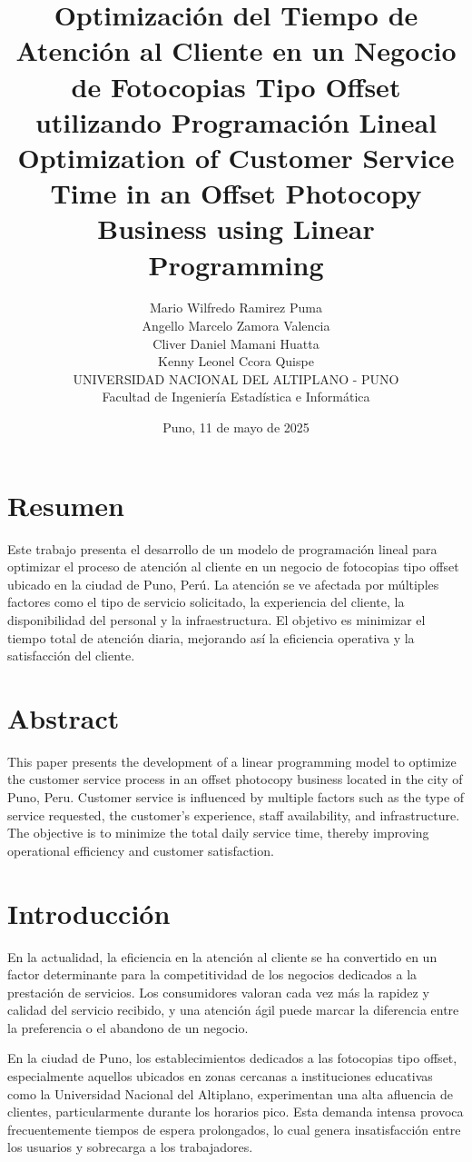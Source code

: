 \documentclass[12pt]{article}
\title{
Optimización del Tiempo de Atención al Cliente en un Negocio de Fotocopias Tipo Offset utilizando Programación Lineal\\[0.5em]
\large Optimization of Customer Service Time in an Offset Photocopy Business using Linear Programming
}
\author{
Mario Wilfredo Ramirez Puma \\
Angello Marcelo Zamora Valencia \\
Cliver Daniel Mamani Huatta \\
Kenny Leonel Ccora Quispe \\[0.8em]
UNIVERSIDAD NACIONAL DEL ALTIPLANO - PUNO \\
Facultad de Ingeniería Estadística e Informática
}
\date{Puno, 11 de mayo de 2025}
\begin{document}
\maketitle

\section*{Resumen}
Este trabajo presenta el desarrollo de un modelo de programación lineal para optimizar el proceso de atención al cliente en un negocio de fotocopias tipo offset ubicado en la ciudad de Puno, Perú. La atención se ve afectada por múltiples factores como el tipo de servicio solicitado, la experiencia del cliente, la disponibilidad del personal y la infraestructura. El objetivo es minimizar el tiempo total de atención diaria, mejorando así la eficiencia operativa y la satisfacción del cliente.

\section*{Abstract}
This paper presents the development of a linear programming model to optimize the customer service process in an offset photocopy business located in the city of Puno, Peru. Customer service is influenced by multiple factors such as the type of service requested, the customer's experience, staff availability, and infrastructure. The objective is to minimize the total daily service time, thereby improving operational efficiency and customer satisfaction.


\newpage
\section{Introducción}

En la actualidad, la eficiencia en la atención al cliente se ha convertido en un factor determinante para la competitividad de los negocios dedicados a la prestación de servicios. Los consumidores valoran cada vez más la rapidez y calidad del servicio recibido, y una atención ágil puede marcar la diferencia entre la preferencia o el abandono de un negocio.

En la ciudad de Puno, los establecimientos dedicados a las fotocopias tipo offset, especialmente aquellos ubicados en zonas cercanas a instituciones educativas como la Universidad Nacional del Altiplano, experimentan una alta afluencia de clientes, particularmente durante los horarios pico. Esta demanda intensa provoca frecuentemente tiempos de espera prolongados, lo cual genera insatisfacción entre los usuarios y sobrecarga a los trabajadores.
\end{document}
